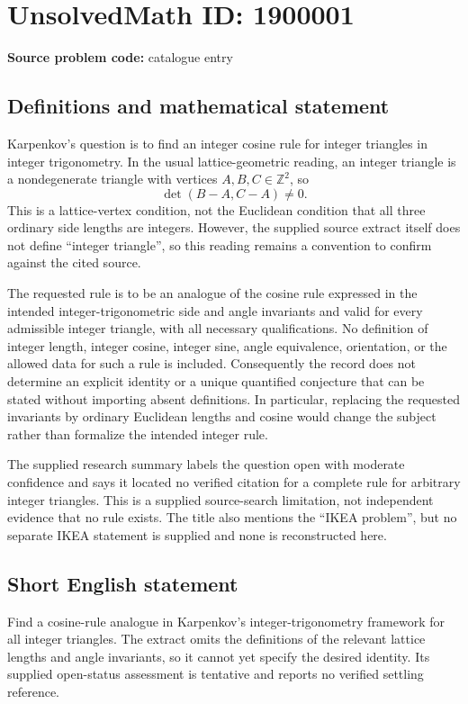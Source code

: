 \documentclass[11pt]{article}
\newcommand{\Z}{\mathbb{Z}}
\begin{document}
\section*{UnsolvedMath ID: 1900001}
\textbf{Source problem code:} catalogue entry
\subsection{Definitions and mathematical statement}
Karpenkov's question is to find an integer cosine rule for integer triangles in integer trigonometry. In the usual lattice-geometric reading, an integer triangle is a nondegenerate triangle with vertices $A,B,C\in\Z^2$, so
\[
\det(B-A,C-A)\ne0.
\]
This is a lattice-vertex condition, not the Euclidean condition that all three ordinary side lengths are integers. However, the supplied source extract itself does not define ``integer triangle'', so this reading remains a convention to confirm against the cited source.

The requested rule is to be an analogue of the cosine rule expressed in the intended integer-trigonometric side and angle invariants and valid for every admissible integer triangle, with all necessary qualifications. No definition of integer length, integer cosine, integer sine, angle equivalence, orientation, or the allowed data for such a rule is included. Consequently the record does not determine an explicit identity or a unique quantified conjecture that can be stated without importing absent definitions. In particular, replacing the requested invariants by ordinary Euclidean lengths and cosine would change the subject rather than formalize the intended integer rule.

The supplied research summary labels the question open with moderate confidence and says it located no verified citation for a complete rule for arbitrary integer triangles. This is a supplied source-search limitation, not independent evidence that no rule exists. The title also mentions the ``IKEA problem'', but no separate IKEA statement is supplied and none is reconstructed here.
\subsection{Short English statement}
Find a cosine-rule analogue in Karpenkov's integer-trigonometry framework for all integer triangles. The extract omits the definitions of the relevant lattice lengths and angle invariants, so it cannot yet specify the desired identity. Its supplied open-status assessment is tentative and reports no verified settling reference.
\end{document}
